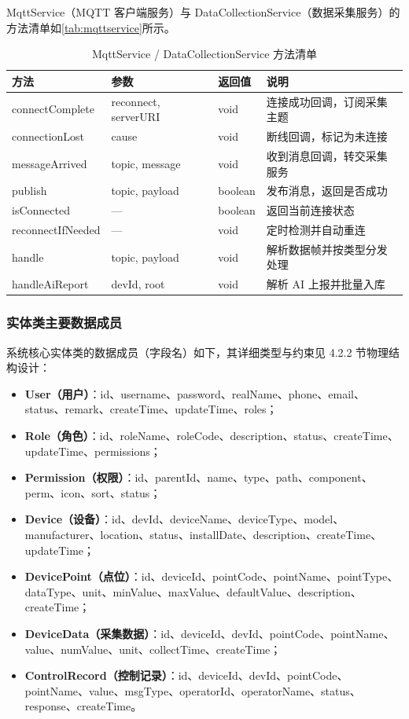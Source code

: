 \documentclass[12pt,hyperref,a4paper,UTF8]{ctexart}
\begin{document}
MqttService（MQTT 客户端服务）与 DataCollectionService（数据采集服务）的方法清单如\autoref{tab:mqttservice}所示。

\begin{table}[!htbp]
    \centering
    \caption{MqttService / DataCollectionService 方法清单}
    \label{tab:mqttservice}
    \begin{tabularx}{0.90\textwidth}{@{}L{3.2cm} L{3.4cm} L{2.3cm} Y@{}}
    \toprule
    \textbf{方法} & \textbf{参数} & \textbf{返回值} & \textbf{说明} \\
    \midrule
    connectComplete & reconnect, serverURI & void & 连接成功回调，订阅采集主题 \\
    connectionLost & cause & void & 断线回调，标记为未连接 \\
    messageArrived & topic, message & void & 收到消息回调，转交采集服务 \\
    publish & topic, payload & boolean & 发布消息，返回是否成功 \\
    isConnected & — & boolean & 返回当前连接状态 \\
    reconnectIfNeeded & — & void & 定时检测并自动重连 \\
    handle & topic, payload & void & 解析数据帧并按类型分发处理 \\
    handleAiReport & devId, root & void & 解析 AI 上报并批量入库 \\
    \bottomrule
    \end{tabularx}
\end{table}

\subsubsection{实体类主要数据成员}

系统核心实体类的数据成员（字段名）如下，其详细类型与约束见 4.2.2 节物理结构设计：

\begin{itemize}
    \item \textbf{User（用户）}：id、username、password、realName、phone、email、status、remark、createTime、updateTime、roles；
    \item \textbf{Role（角色）}：id、roleName、roleCode、description、status、createTime、updateTime、permissions；
    \item \textbf{Permission（权限）}：id、parentId、name、type、path、component、perm、icon、sort、status；
    \item \textbf{Device（设备）}：id、devId、deviceName、deviceType、model、manufacturer、location、status、installDate、description、createTime、updateTime；
    \item \textbf{DevicePoint（点位）}：id、deviceId、pointCode、pointName、pointType、dataType、unit、minValue、maxValue、defaultValue、description、createTime；
    \item \textbf{DeviceData（采集数据）}：id、deviceId、devId、pointCode、pointName、value、numValue、unit、collectTime、createTime；
    \item \textbf{ControlRecord（控制记录）}：id、deviceId、devId、pointCode、pointName、value、msgType、operatorId、operatorName、status、response、createTime。
\end{itemize}
\end{document}
